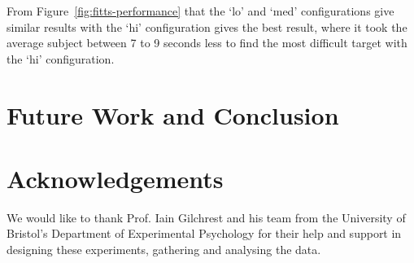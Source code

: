 \documentclass[format=sigconf, review=true, screen=true, anonymous=true]{acmart}
\begin{document}
From Figure~\ref{fig:fitts-performance} that the `lo' and `med' configurations give similar results with the `hi' configuration gives the best result, where it took the average subject between 7 to 9 seconds less to find the most difficult target with the `hi' configuration. 

\section{Future Work and Conclusion}

\section{Acknowledgements}

We would like to thank Prof. Iain Gilchrest and his team from the University of Bristol's Department of Experimental Psychology for their help and support in designing these experiments, gathering and analysing the data. 



\end{document}
